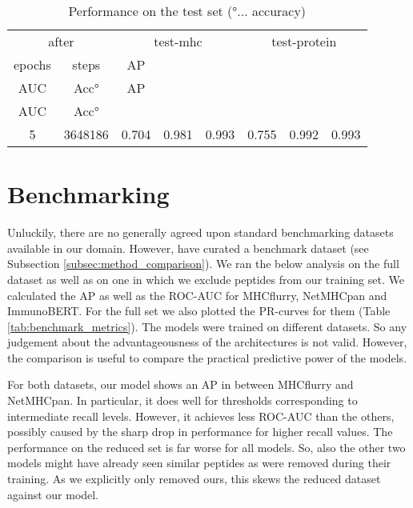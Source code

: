 \documentclass[msc,deptreport,ai]{infthesis} %
\begin{document}
		\begin{table}[H]
			\vskip 3mm
			\begin{center}
			\begin{small}
			\begin{sc}
			\begin{tabular}{| c c | c c c | c c c |}	
			\hline
			\multicolumn{2}{|c|}{after}				& \multicolumn{3}{c|}{test-mhc}		& \multicolumn{3}{c|}{test-protein} \\
			epochs			& steps			& \gls{AP}		& {\tiny\makecell{\gls{ROC}\\ \gls{AUC}}}	& Acc°  	& \gls{AP} 	& {\tiny\makecell{\gls{ROC}\\ \gls{AUC}}}	&  Acc° \\
			\hline
			\hline
			\hline
			5 & 3648186 & 0.704 & 0.981 & 0.993 & 0.755 & 0.992 & 0.993 \\			
			\hline
			\end{tabular}
			\end{sc}
			\end{small}
			\caption{Performance on the test set (°... accuracy)}
			\label{tab:test}
			\end{center}
			\vskip -7mm
		\end{table}	

	
	\section{Benchmarking}
	\label{sec:results_benchmarking}
		Unluckily, there are no generally agreed upon standard benchmarking datasets available in our domain. However, \cite{odonnell_mhcflurry_2020} have curated a benchmark dataset (see Subsection \ref{subsec:method_comparison}). We ran the below analysis on the full dataset as well as on one in which we exclude peptides from our training set. We calculated the \gls{AP} as well as the \gls{ROC}-\gls{AUC} for MHCflurry, NetMHCpan and ImmunoBERT. For the full set we also plotted the \gls{PR}-curves for them (Table \ref{tab:benchmark_metrics}). The models were trained on different datasets. So any judgement about the advantageousness of the architectures is not valid. However, the comparison is useful to compare the practical predictive power of the models.

		For both datasets, our model shows an \gls{AP} in between MHCflurry and NetMHCpan. In particular, it does well for thresholds corresponding to intermediate recall levels. However, it achieves less \gls{ROC}-\gls{AUC} than the others, possibly caused by the sharp drop in performance for higher recall values. The performance on the reduced set is far worse for all models. So, also the other two models might have already seen similar peptides as were removed during their training. As we explicitly only removed ours, this skews the reduced dataset against our model.
		
\end{document}
